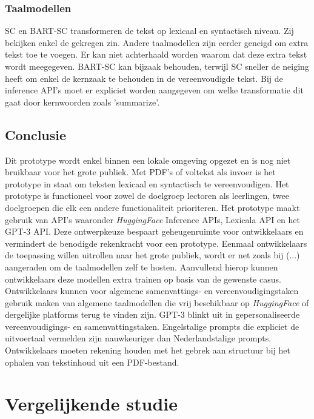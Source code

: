 \subsection{Taalmodellen}

SC en BART-SC transformeren de tekst op lexicaal en syntactisch niveau. Zij bekijken enkel de gekregen zin. Andere taalmodellen zijn eerder geneigd om extra tekst toe te voegen. Er kan niet achterhaald worden waarom dat deze extra tekst wordt meegegeven.
BART-SC kan bijzaak behouden, terwijl SC sneller de neiging heeft om enkel de kernzaak te behouden in de vereenvoudigde tekst. Bij de inference API's moet er expliciet worden aangegeven om welke transformatie dit gaat door kernwoorden zoals 'summarize'.

\section{Conclusie}

Dit prototype wordt enkel binnen een lokale omgeving opgezet en is nog niet bruikbaar voor het grote publiek. Met PDF's of voltekst als invoer is het prototype in staat om teksten lexicaal en syntactisch te vereenvoudigen. Het prototype is functioneel voor zowel de doelgroep lectoren als leerlingen, twee doelgroepen die elk een andere functionaliteit prioriteren. Het prototype maakt gebruik van API's waaronder \textit{HuggingFace} Inference APIs, Lexicala API en het GPT-3 API. Deze ontwerpkeuze bespaart geheugenruimte voor ontwikkelaars en vermindert de benodigde rekenkracht voor een prototype. Eenmaal ontwikkelaars de toepassing willen uitrollen naar het grote publiek, wordt er net zoals bij (...) aangeraden om de taalmodellen zelf te hosten. Aanvullend hierop kunnen ontwikkelaars deze modellen extra trainen op basis van de gewenste casus. Ontwikkelaars kunnen voor algemene samenvattings- en vereenvoudigingstaken gebruik maken van algemene taalmodellen die vrij beschikbaar op \textit{HuggingFace} of dergelijke platforms terug te vinden zijn. GPT-3 blinkt uit in gepersonaliseerde vereenvoudigings- en samenvattingstaken. Engelstalige prompts die expliciet de uitvoertaal vermelden zijn nauwkeuriger dan Nederlandstalige prompts. Ontwikkelaars moeten rekening houden met het gebrek aan structuur bij het ophalen van tekstinhoud uit een PDF-bestand.

\chapter{Vergelijkende studie}

